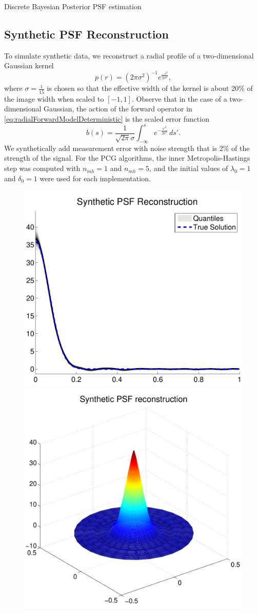 \begin{chapter}{Discrete Bayesian Posterior PSF estimation}
\subsection{Synthetic PSF Reconstruction}
To simulate synthetic data, we reconstruct a radial profile of a two-dimensional Gaussian kernel
\begin{equation} \label{eq:syntheticx}
  p(r) = (2\pi\sigma^2)^{-1} e^{\frac{-r^2}{2\sigma^2}},
\end{equation}
where $\sigma = \frac1{15}$ is chosen so that the effective width of the kernel is about 20\% of the image width when scaled to $[-1,1]$.
Observe that in the case of a two-dimensional Gaussian, the action of the forward operator in \eqref{eq:radialForwardModelDeterministic} is the scaled error function
\begin{equation} \label{eq:syntheticb}
  b(s) = \frac 1{\sqrt{2\pi}\sigma} \int_{-\infty}^s e^{-\frac{s'^2}{2\sigma^2}}\,ds'.
\end{equation}
We synthetically add measurement error with noise strength that is 2\% of the strength of the signal.
For the PCG algorithms, the inner Metropolis-Hastings step was computed with $n_{mh} = 1$ and $n_{mh} = 5$, and the initial values of $\lambda_0 = 1$ and $\delta_0 = 1$ were used for each implementation.
\begin{figure}[p]
  \begin{center}
  \includegraphics[width=.4\textwidth]{figures/syntheticPSFrecon.pdf}\includegraphics[width=.4\textwidth]{figures/synthetic2dPSFrecon.pdf}

\end{center}
\end{figure}
\end{chapter}

